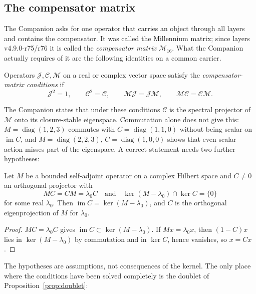 \subsection{The compensator matrix}

The Companion asks for one operator that carries an object through all layers and contains the compensator.  It was called
the Millennium matrix; since layers v4.9.0-r75/r76 it is called the \emph{compensator matrix} \(\mathcal M_{16}\).  What the
Companion actually requires of it are the following identities on a common carrier.

\begin{definition}\label{def:cm}
Operators \(\mathcal J,\mathcal C,\mathcal M\) on a real or complex vector space satisfy the \emph{compensator-matrix conditions} if
\[
\mathcal J^2=1,\qquad \mathcal C^2=\mathcal C,\qquad
\mathcal M\mathcal J=\mathcal J\mathcal M,\qquad \mathcal M\mathcal C=\mathcal C\mathcal M .
\]
\end{definition}

The Companion states that under these conditions \(\mathcal C\) is the spectral projector of \(\mathcal M\) onto its closure-stable
eigenspace.  Commutation alone does not give this: \(M=\operatorname{diag}(1,2,3)\) commutes with \(C=\operatorname{diag}(1,1,0)\)
without being scalar on \(\operatorname{im}C\), and \(M=\operatorname{diag}(2,2,3)\), \(C=\operatorname{diag}(1,0,0)\) shows that even
scalar action misses part of the eigenspace.  A correct statement needs two further hypotheses:

\begin{proposition}\label{prop:spectral}
Let \(M\) be a bounded self-adjoint operator on a complex Hilbert space and \(C\neq0\) an orthogonal projector with
\[
MC=CM=\lambda_0C\quad\text{and}\quad\ker(M-\lambda_0)\cap\ker C=\{0\}
\]
for some real \(\lambda_0\).  Then \(\operatorname{im}C=\ker(M-\lambda_0)\), and \(C\) is the orthogonal eigenprojection of \(M\) for
\(\lambda_0\).
\end{proposition}

\begin{proof}
\(MC=\lambda_0C\) gives \(\operatorname{im}C\subset\ker(M-\lambda_0)\).  If \(Mx=\lambda_0x\), then \((1-C)x\) lies in
\(\ker(M-\lambda_0)\) by commutation and in \(\ker C\), hence vanishes, so \(x=Cx\).
\end{proof}

The hypotheses are assumptions, not consequences of the kernel.  The only place where the conditions have been solved
completely is the doublet of Proposition~\ref{prop:doublet}:

